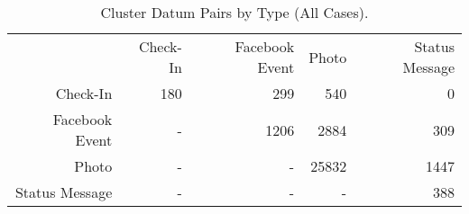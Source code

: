 \begin{table}[htp]
	\begin{center}
	\caption{Cluster Datum Pairs by Type (All Cases).}
	\label{tab:ch6_table_all_xtype_cluster}
		\begin{tabular}{r r r r r }
		\toprule
			 & Check-In & Facebook Event & Photo & Status Message\\
			Check-In & 180 & 299 & 540 & 0\\
			Facebook Event & - & 1206 & 2884 & 309\\
			Photo & - & - & 25832 & 1447\\
			Status Message & - & - & - & 388\\
		\bottomrule
		\end{tabular}
	\end{center}
\end{table}